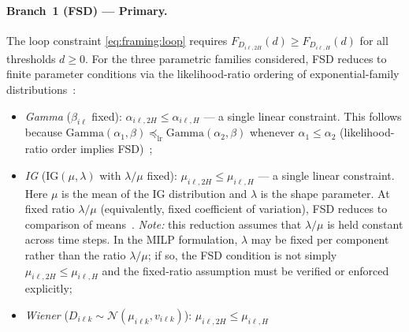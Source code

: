 \documentclass[11pt,a4paper]{article}
\theoremstyle{plain}
\theoremstyle{definition}
\theoremstyle{remark}
\begin{document}
\paragraph{Branch~1 (FSD) --- Primary.}
The loop constraint \eqref{eq:framing:loop} requires
$F_{D_{i\ell,2H}}(d) \ge F_{D_{i\ell,H}}(d)$ for all thresholds $d \ge 0$.
For the three parametric families considered, FSD reduces to finite parameter
conditions via the likelihood-ratio ordering of exponential-family
distributions~\cite[Thm.~1.C.1]{shaked2007}:
\begin{itemize}[nosep]
  \item \emph{Gamma} ($\beta_{i\ell}$ fixed): $\alpha_{i\ell,2H} \le \alpha_{i\ell,H}$
        --- a single linear constraint.
        This follows because $\mathrm{Gamma}(\alpha_1, \beta) \preceq_{\mathrm{lr}}
        \mathrm{Gamma}(\alpha_2, \beta)$ whenever $\alpha_1 \le \alpha_2$
        (likelihood-ratio order implies FSD)~\cite[Thm.~1.C.1]{shaked2007};
  \item \emph{IG} ($\mathrm{IG}(\mu, \lambda)$ with $\lambda/\mu$ fixed):
        $\mu_{i\ell,2H} \le \mu_{i\ell,H}$
        --- a single linear constraint.
        Here $\mu$ is the mean of the IG distribution and $\lambda$ is the shape
        parameter. At fixed ratio $\lambda/\mu$ (equivalently, fixed coefficient of
        variation), FSD reduces to comparison of means~\cite[Sec.~4]{ye2014}.
        \emph{Note:} this reduction assumes that $\lambda/\mu$ is held constant
        across time steps. In the MILP formulation, $\lambda$ may be fixed per
        component rather than the ratio $\lambda/\mu$; if so, the FSD condition
        is not simply $\mu_{i\ell,2H} \le \mu_{i\ell,H}$ and the fixed-ratio
        assumption must be verified or enforced explicitly;
  \item \emph{Wiener} ($D_{i\ell k} \sim \mathcal{N}(\mu_{i\ell k}, v_{i\ell k})$):
        $\mu_{i\ell,2H} \le \mu_{i\ell,H}$

\end{itemize}
\end{document}
